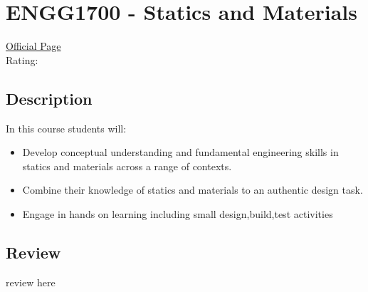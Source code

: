 \hypertarget{ENGG1700}{\section{ENGG1700 - Statics and Materials}}

\large
\textcolor{turbo_purple}{\href{https://my.uq.edu.au/programs-courses/course.html?course_code=ENGG1700}{Official Page}} \\
Rating: \cstar\cstar\cstar\cstar\ostar

\normalsize
\subsection*{Description}
In this course students will:
\begin{itemize}
    \item Develop conceptual understanding and fundamental engineering skills in statics and materials across a range of contexts.
    \item Combine their knowledge of statics and materials to an authentic design task.
    \item Engage in hands on learning including small design,build,test activities
\end{itemize}

\subsection*{Review}
review here
